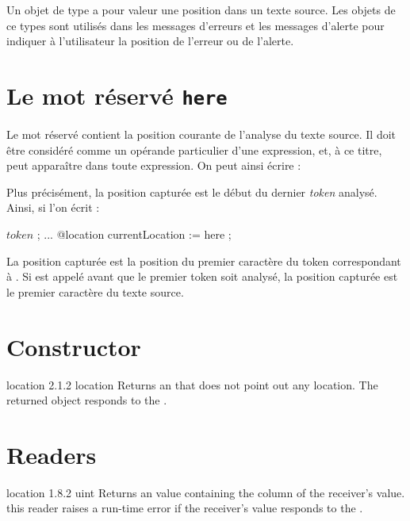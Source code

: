 

Un objet de type  a pour valeur une position dans un texte source. Les objets de ce types sont utilisés dans les messages d'erreurs et les messages d'alerte pour indiquer à l'utilisateur la position de l'erreur ou de l'alerte.





\section{Le mot réservé \texttt{here}}

Le mot réservé  contient la position courante de l'analyse du texte source. Il doit être considéré comme un opérande particulier d'une expression, et, à ce titre, peut apparaître dans toute expression. On peut ainsi écrire :


Plus précisément, la position capturée est le début du dernier \emph{token} analysé. Ainsi, si l'on écrit :

\begin{galgascode}
  $token$ ;
  ...
  @location currentLocation := here ;
\end{galgascode}

La position capturée est la position du premier caractère du token correspondant à . Si  est appelé avant que le premier token soit analysé, la position capturée est le premier caractère du texte source.

\section{Constructor}

{location}
{2.1.2}
{location}
{Returns an  that does not point out any location.}
{The returned object responds  to the .}

\section{Readers}

{location}
{1.8.2}
{uint}
{Returns an  value containing the column of the receiver's value.}
{this reader raises a run-time error if the receiver's value responds  to the .}


